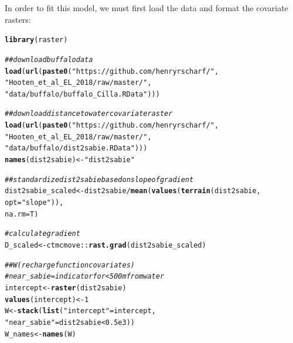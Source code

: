 \documentclass[12pt]{article}\usepackage[]{graphicx}\usepackage[]{xcolor}
\makeatletter
\newcommand{\hlnum}[1]{\textcolor[rgb]{0.686,0.059,0.569}{#1}}%
\newcommand{\hlstr}[1]{\textcolor[rgb]{0.192,0.494,0.8}{#1}}%
\newcommand{\hlcom}[1]{\textcolor[rgb]{0.678,0.584,0.686}{\textit{#1}}}%
\newcommand{\hlopt}[1]{\textcolor[rgb]{0,0,0}{#1}}%
\newcommand{\hlstd}[1]{\textcolor[rgb]{0.345,0.345,0.345}{#1}}%
\newcommand{\hlkwb}[1]{\textcolor[rgb]{0.69,0.353,0.396}{#1}}%
\newcommand{\hlkwc}[1]{\textcolor[rgb]{0.333,0.667,0.333}{#1}}%
\newcommand{\hlkwd}[1]{\textcolor[rgb]{0.737,0.353,0.396}{\textbf{#1}}}%
\newenvironment{kframe}{%
 \def\at@end@of@kframe{}%
 \ifinner\ifhmode%
  \def\at@end@of@kframe{\end{minipage}}%
  \begin{minipage}{\columnwidth}%
 \fi\fi%
 \def\FrameCommand##1{\hskip\@totalleftmargin \hskip-\fboxsep
 \colorbox{shadecolor}{##1}\hskip-\fboxsep
     \hskip-\linewidth \hskip-\@totalleftmargin \hskip\columnwidth}%
 \MakeFramed {\advance\hsize-\width
   \@totalleftmargin\z@ \linewidth\hsize
   \@setminipage}}%
 {\par\unskip\endMakeFramed%
 \at@end@of@kframe}
\newenvironment{knitrout}{}{} %
\makeatother
\begin{document}
In order to fit this model, we must first load the data and format the covariate rasters:
\begin{knitrout}
\color{fgcolor}\begin{kframe}
\begin{alltt}
\hlkwd{library}\hlstd{(raster)}

\hlcom{## download buffalo data}
\hlkwd{load}\hlstd{(}\hlkwd{url}\hlstd{(}\hlkwd{paste0}\hlstd{(}\hlstr{"https://github.com/henryrscharf/"}\hlstd{,}
         \hlstr{"Hooten_et_al_EL_2018/raw/master/"}\hlstd{,}
         \hlstr{"data/buffalo/buffalo_Cilla.RData"}\hlstd{)))}

\hlcom{## download distance to water covariate raster}
\hlkwd{load}\hlstd{(}\hlkwd{url}\hlstd{(}\hlkwd{paste0}\hlstd{(}\hlstr{"https://github.com/henryrscharf/"}\hlstd{,}
                \hlstr{"Hooten_et_al_EL_2018/raw/master/"}\hlstd{,}
                \hlstr{"data/buffalo/dist2sabie.RData"}\hlstd{)))}
\hlkwd{names}\hlstd{(dist2sabie)} \hlkwb{<-} \hlstr{"dist2sabie"}

\hlcom{## standardize dist2sabie based on slope of gradient}
\hlstd{dist2sabie_scaled} \hlkwb{<-} \hlstd{dist2sabie} \hlopt{/} \hlkwd{mean}\hlstd{(}\hlkwd{values}\hlstd{(}\hlkwd{terrain}\hlstd{(dist2sabie,}
                                                      \hlkwc{opt} \hlstd{=} \hlstr{"slope"}\hlstd{)),}
                                       \hlkwc{na.rm} \hlstd{= T)}

\hlcom{# calculate gradient}
\hlstd{D_scaled} \hlkwb{<-} \hlstd{ctmcmove}\hlopt{::}\hlkwd{rast.grad}\hlstd{(dist2sabie_scaled)}

\hlcom{## W (recharge function covariates)}
\hlcom{# near_sabie = indicator for <500m from water}
\hlstd{intercept} \hlkwb{<-} \hlkwd{raster}\hlstd{(dist2sabie)}
\hlkwd{values}\hlstd{(intercept)} \hlkwb{<-} \hlnum{1}
\hlstd{W} \hlkwb{<-} \hlkwd{stack}\hlstd{(}\hlkwd{list}\hlstd{(}\hlstr{"intercept"} \hlstd{= intercept,}
                \hlstr{"near_sabie"} \hlstd{= dist2sabie} \hlopt{<} \hlnum{0.5e3}\hlstd{))}
\hlstd{W_names} \hlkwb{<-} \hlkwd{names}\hlstd{(W)}


\end{alltt}
\end{kframe}
\end{knitrout}
\end{document}

